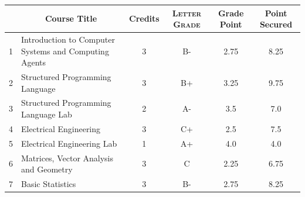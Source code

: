 \documentclass[11pt]{article}
\newcommand*{\numtwo}[1]{\pgfmathprintnumber[
                    fixed, precision=2, fixed zerofill=true]{#1}}
\begin{document}
                \begin{center}
                    \renewcommand{\arraystretch}{1.08}
                    
                \begin{tabular}{|c|l|c|>{\scshape}c|c|c|}
                \hline  \rule[-1ex]{0pt}{3.5ex} {\centering{\bf Course Code}} &  \multicolumn{1}{c|}{\textbf{Course Title}}  & {\bf Credits} & {\bf Letter Grade} & {\bf Grade Point} & {\bf Point Secured}  \\ 
                \hline   1 &  Introduction to Computer Systems and Computing Agents		 & 3 & B- & 2.75 & 8.25 \\ %
                \hline   2 &  Structured Programming Language		 & 3 & B+ & 3.25 & 9.75 \\ %
                \hline   3 &  Structured Programming Language Lab		 & 2 & A- & 3.5 & 7.0 \\ %
                \hline   4 &  Electrical Engineering		 & 3 & C+ & 2.5 & 7.5 \\ %
                \hline   5 &  Electrical Engineering Lab		 & 1 & A+ & 4.0 & 4.0 \\ %
                \hline   6 &  Matrices, Vector Analysis and Geometry		 & 3 & C & 2.25 & 6.75 \\ %
                \hline   7 &  Basic Statistics		 & 3 & B- & 2.75 & 8.25 \\ %

\hline                %
                \end{tabular}
                \end{center}
                \renewcommand{\arraystretch}{1.03}
\end{document}

